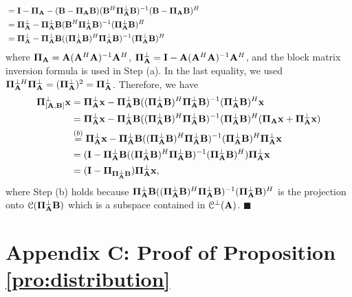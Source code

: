 \documentclass[11pt, draft, onecolumn ]{IEEEtran}
\begin{document}
            \begin{align*}
            &= \Ibf - \Pibf_{\Abf} - (\Bbf - \Pibf_{\Abf}\Bbf) (\Bbf^H\Pibf_{\Abf}^\bot\Bbf)^{-1}  (\Bbf - \Pibf_{\Abf}\Bbf)^H \hspace{18em}\\
            &= \Pibf_{\Abf}^\bot - \Pibf_{\Abf}^\bot\Bbf (\Bbf^H\Pibf_{\Abf}^\bot\Bbf)^{-1}(\Pibf_{\Abf}^\bot\Bbf)^H \\
            &= \Pibf_{\Abf}^\bot - \Pibf_{\Abf}^\bot\Bbf ((\Pibf_{\Abf}^\bot\Bbf)^H\Pibf_{\Abf}^\bot\Bbf)^{-1}(\Pibf_{\Abf}^\bot\Bbf)^H
 \end{align*}
         where ${\bf \Pi}_{\bf A} =  {\bf A} ({\bf A}^H {\bf A})^{-1}{\bf A}^H $, ${\bf \Pi}_{\bf A}^\bot ={\bf I} -  {\bf A} ({\bf A}^H {\bf A})^{-1}{\bf A}^H $, and the
         block matrix inversion formula is used in Step (a).
         In the last equality, we used ${\bf \Pi}_{{\bf A}}^{\bot H}{\bf \Pi}_{{\bf A}}^\bot=({\bf \Pi}_{{\bf A}}^\bot)^2 = {\bf \Pi}_{{\bf A}}^\bot$.
          Therefore, we have
        \begin{align*}
            {\bf \Pi}_{[{\bf A},{\bf B}]}^\bot {\bf x} &=  {\bf \Pi}_{{\bf A}}^\bot {\bf x} - {\bf \Pi}_{{\bf A}}^\bot{\bf B} (({\bf \Pi}_{{\bf A}}^\bot{\bf B})^H{\bf \Pi}_{{\bf A}}^\bot{\bf B})^{-1}({\bf \Pi}_{{\bf A}}^\bot{\bf B})^H  {\bf x} \\
           & ={\bf \Pi}_{{\bf A}}^\bot {\bf x} - {\bf \Pi}_{{\bf A}}^\bot{\bf B} (({\bf \Pi}_{{\bf A}}^\bot{\bf B})^H{\bf \Pi}_{{\bf A}}^\bot{\bf B})^{-1}({\bf \Pi}_{{\bf A}}^\bot{\bf B})^H ({\bf \Pi}_{{\bf A}}{\bf x} + {\bf \Pi}_{{\bf A}}^\bot{\bf x}) \\
           &\stackrel{(b)}{=}{\bf \Pi}_{{\bf A}}^\bot {\bf x} - {\bf \Pi}_{{\bf A}}^\bot{\bf B} (({\bf \Pi}_{{\bf A}}^\bot{\bf B})^H{\bf \Pi}_{{\bf A}}^\bot{\bf B})^{-1}({\bf \Pi}_{{\bf A}}^\bot{\bf B})^H {\bf \Pi}_{{\bf A}}^\bot{\bf x}\\
           &=({\bf I}- {\bf \Pi}_{{\bf A}}^\bot{\bf B} (({\bf \Pi}_{{\bf A}}^\bot{\bf B})^H{\bf \Pi}_{{\bf A}}^\bot{\bf B})^{-1}({\bf \Pi}_{{\bf A}}^\bot{\bf B})^H ) {\bf \Pi}_{{\bf A}}^\bot{\bf x}\\
           &= ({\bf I}-{\bf \Pi}_{{\bf \Pi}_{\bf A}^\perp {\bf B}}){\bf \Pi}_{\bf A}^\perp {\bf x},
        \end{align*}
where Step (b) holds because ${\bf \Pi}_{{\bf A}}^\bot{\bf B} (({\bf \Pi}_{{\bf A}}^\bot{\bf B})^H{\bf \Pi}_{{\bf A}}^\bot{\bf B})^{-1}({\bf \Pi}_{{\bf A}}^\bot{\bf B})^H$ is the projection onto ${\cal C}({\bf \Pi}_{{\bf A}}^\bot{\bf B})$ which is a subspace contained in ${\cal C}^\perp({\bf A})$.
\hfill{$\blacksquare$}








\section*{Appendix C: Proof of Proposition \ref{pro:distribution}}
\end{document}

